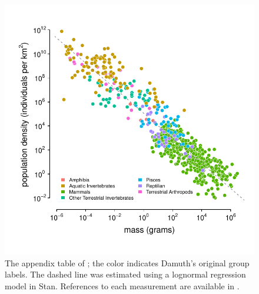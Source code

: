 \documentclass[11pt]{article}
\begin{document}
\begin{figure}[!htb]
  \centering
  \includegraphics[]{figures/damuth.pdf}

  \caption{The appendix table of \textcite{Damuth1987-sg}; the color indicates
    Damuth's original group labels. The dashed line was estimated using a
    lognormal regression model in Stan. References to each measurement are
  available in \textcite{Damuth1987-sg}.}

  \label{suppfig:damuth}
\end{figure}
\end{document}
